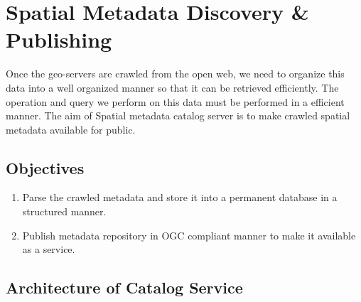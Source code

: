 \chapter{Spatial Metadata Discovery \& Publishing}

Once the geo-servers are crawled from the open web, we need to organize this data into a well organized manner so that it can be retrieved efficiently. The operation and query we perform on this data must be performed in a efficient manner. The aim of Spatial metadata catalog server is to make crawled spatial metadata available for public.

\section{Objectives}

\begin{enumerate}
    \item Parse the crawled metadata and store it into a permanent database in a structured manner.
    \item Publish metadata repository in OGC compliant manner to make it available as a service.
\end{enumerate}

\section{Architecture of Catalog Service}

